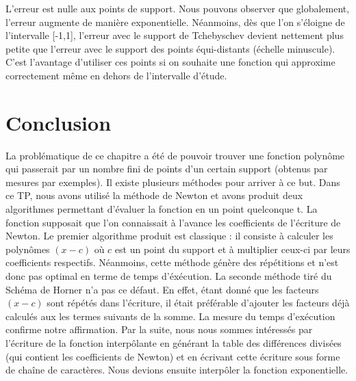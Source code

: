 \documentclass[a4paper,10pt]{report}
\begin{document}
L'erreur est nulle aux points de support. Nous pouvons observer que globalement, l'erreur augmente de manière exponentielle. Néanmoins, dès que l'on s'éloigne de l'intervalle [-1,1], l'erreur avec le support de Tchebyschev devient nettement plus petite que l'erreur avec le support des points équi-distants (échelle minuscule). C'est l'avantage d'utiliser ces points si on souhaite une fonction qui approxime correctement même en dehors de l'intervalle d'étude.

\chapter*{Conclusion}

La problématique de ce chapitre a été de pouvoir trouver une fonction polynôme qui passerait par un nombre fini de points d’un certain support (obtenus par mesures par exemples). Il existe plusieurs méthodes pour arriver à ce but.
\newline
\newline
Dans ce TP, nous avons utilisé la méthode de Newton et avons produit deux algorithmes permettant d’évaluer la fonction en un point quelconque t. La fonction supposait que l’on connaissait à l’avance les coefficients de l’écriture de Newton.
\newline
\newline
Le premier algorithme produit est classique : il consiste à calculer les polynômes $(x-c)$ où $c$ est un point du support et à multiplier ceux-ci par leurs coefficients respectifs. Néanmoins, cette méthode génère des répétitions et n’est donc pas optimal en terme de temps d’éxécution.
\newline
\newline 
La seconde méthode tiré du Schéma de Horner n’a pas ce défaut. En effet, étant donné que les facteurs $(x-c)$ sont répétés dans l’écriture, il était préférable d’ajouter les facteurs déjà calculés aux les termes suivants de la somme.
\newline
\newline
La mesure du temps d’exécution confirme notre affirmation.
\newline
\newline
Par la suite, nous nous sommes intéressés par l’écriture de la fonction interpôlante en générant la table des différences divisées (qui contient les coefficients de Newton) et en écrivant cette écriture sous forme de chaîne de caractères. Nous devions ensuite interpôler la fonction exponentielle. 
\end{document}

